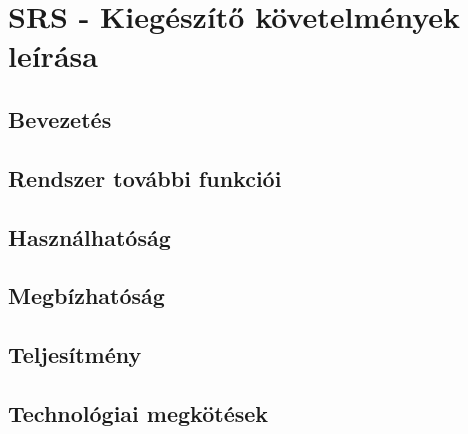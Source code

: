 \chapter{SRS - Kiegészítő követelmények leírása}\label{sect:SRS}
\section{Bevezetés}

\section{Rendszer további funkciói}

\section{Használhatóság}

\section{Megbízhatóság}

\section{Teljesítmény}

\section{Technológiai megkötések}


